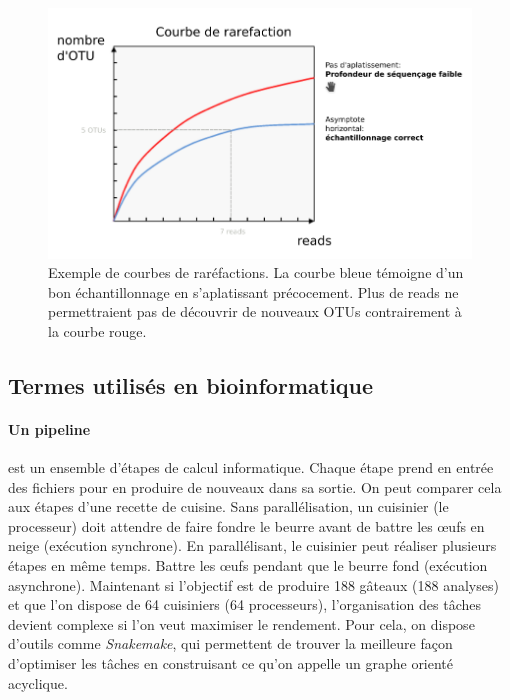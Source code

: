 \documentclass[12pt,a4paper]{article}
\begin{document}
\begin{figure}[ht]
\begin{center}
\includegraphics[scale=0.5]{img/rarefaction_example.png}\hfill
\end{center}
\caption{Exemple de courbes de raréfactions. La courbe bleue témoigne d'un bon échantillonnage en s’aplatissant précocement. Plus de reads ne permettraient pas de découvrir de nouveaux OTUs contrairement à la courbe rouge. }
\label{rarefaction_demo}
\end{figure}

\subsection{Termes utilisés en bioinformatique}

\paragraph{Un pipeline} est un ensemble d'étapes de calcul informatique. Chaque étape prend en entrée des fichiers pour en produire de nouveaux dans sa sortie. On peut comparer cela aux étapes d'une recette de cuisine. Sans parallélisation, un cuisinier (le processeur) doit attendre de faire fondre le beurre avant de battre les œufs en neige (exécution synchrone). En parallélisant, le cuisinier peut réaliser plusieurs étapes en même temps. Battre les œufs pendant que le beurre fond (exécution asynchrone).
Maintenant si l'objectif est de produire 188 gâteaux (188 analyses) et que l'on dispose de 64 cuisiniers (64 processeurs), l'organisation des tâches devient complexe si l'on veut maximiser le rendement. Pour cela, on dispose d'outils comme \textit{Snakemake}\cite{Koster2012}, qui permettent de trouver la meilleure façon d'optimiser les tâches en construisant ce qu'on appelle un graphe orienté acyclique.
\end{document}
